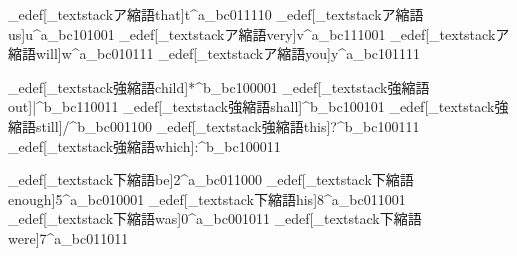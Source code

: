 \brl@char_edef[\brl@char_textstack{ア縮語}{that}]{t^a}{\brl@char_bc011110}%
\brl@char_edef[\brl@char_textstack{ア縮語}{us}]{u^a}{\brl@char_bc101001}%
\brl@char_edef[\brl@char_textstack{ア縮語}{very}]{v^a}{\brl@char_bc111001}%
\brl@char_edef[\brl@char_textstack{ア縮語}{will}]{w^a}{\brl@char_bc010111}%
\brl@char_edef[\brl@char_textstack{ア縮語}{you}]{y^a}{\brl@char_bc101111}%

\brl@char_edef[\brl@char_textstack{強縮語}{child}]{*^b}{\brl@char_bc100001}%
\brl@char_edef[\brl@char_textstack{強縮語}{out}]{|^b}{\brl@char_bc110011}%
\brl@char_edef[\brl@char_textstack{強縮語}{shall}]{\brl@@percent^b}{\brl@char_bc100101}%
\brl@char_edef[\brl@char_textstack{強縮語}{still}]{/^b}{\brl@char_bc001100}%
\brl@char_edef[\brl@char_textstack{強縮語}{this}]{?^b}{\brl@char_bc100111}%
\brl@char_edef[\brl@char_textstack{強縮語}{which}]{:^b}{\brl@char_bc100011}%

\brl@char_edef[\brl@char_textstack{下縮語}{be}]{2^a}{\brl@char_bc011000}%
\brl@char_edef[\brl@char_textstack{下縮語}{enough}]{5^a}{\brl@char_bc010001}%
\brl@char_edef[\brl@char_textstack{下縮語}{his}]{8^a}{\brl@char_bc011001}%
\brl@char_edef[\brl@char_textstack{下縮語}{was}]{0^a}{\brl@char_bc001011}%
\brl@char_edef[\brl@char_textstack{下縮語}{were}]{7^a}{\brl@char_bc011011}%

